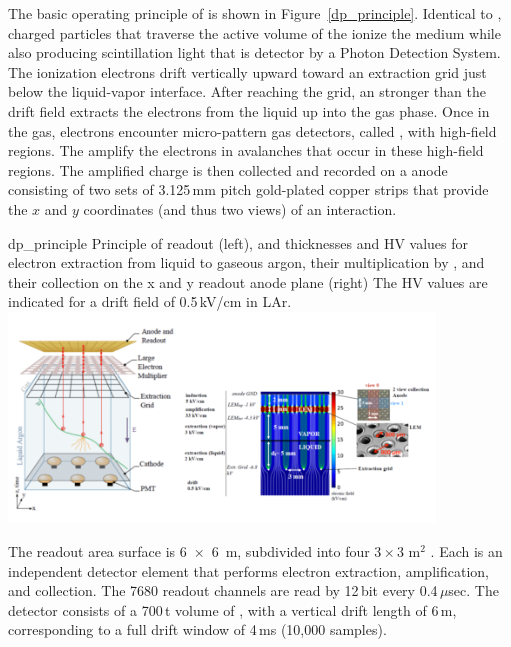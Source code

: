 \documentclass[../main-v1.tex]{subfiles}
\begin{document}
The basic operating principle of  is shown in Figure~\ref{dp_principle}. Identical to , charged particles that traverse the active volume of the  ionize the medium while also producing scintillation
light that is detector by a Photon Detection System. The ionization electrons drift vertically upward %
toward an extraction grid just below the liquid-vapor interface. 
After reaching the grid,
an \efield stronger than the drift field extracts the electrons from the liquid up into the gas phase.
Once in the gas, electrons encounter micro-pattern gas detectors, called , with high-field regions. The  amplify the electrons in avalanches that occur in these
high-field regions. The amplified charge is then collected and recorded on a \twod anode consisting
of two sets of 3.125\,mm pitch gold-plated copper strips that provide the $x$ and $y$ coordinates (and
thus two views) of an interaction.   

\begin{dunefigure}
{dp_principle} %
{Principle of  readout (left), and thicknesses and HV values for electron extraction from liquid to gaseous argon, their
multiplication by , and their collection on the x and y readout anode plane (right) The HV values are
indicated for a drift field of 0.5\,kV/cm in LAr.}
\includegraphics[width=0.85\textwidth]{graphics/IntroFigures/Fig_11_protodune-dp-principle.png}
\end{dunefigure}

The readout area surface is \SI{6x6}{m}, subdivided into four $3\times3$ m$^2$  . Each  is an independent detector element %
that performs electron extraction, amplification, and collection. 
The 7680 readout channels are read by   12\,bit  every 0.4\,$\mu$sec. 
The  detector   consists of a 700\,t volume of , with  a vertical drift length of 6\,m, corresponding to a full drift window of 4\,ms (10,000 samples).
\end{document}
